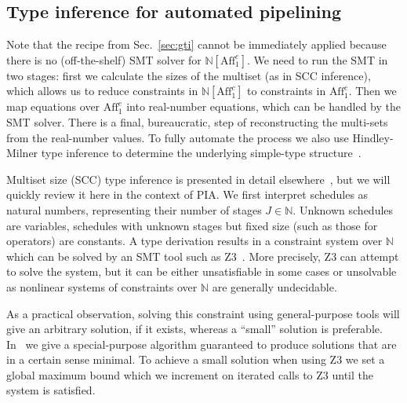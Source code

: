 \documentclass{article}
\begin{document}
\subsection{Type inference for automated pipelining}\label{sec:typin}\label{sec:pip}

Note that the recipe from Sec.~\ref{sec:gti} cannot be immediately applied because there is no (off-the-shelf) SMT solver for $\mathbb N[\text{Aff}_1^c]$. We need to run the SMT in two stages: first we calculate the sizes of the multiset (as in SCC inference), which allows us to reduce constraints in $\mathbb N[\text{Aff}_1^c]$ to constraints in $\text{Aff}_1^c$. Then we map equations over $\text{Aff}_1^c$ into real-number equations, which can be handled by the SMT solver. There is a final, bureaucratic, step of reconstructing the multi-sets from the real-number values. To fully automate the process we also use Hindley-Milner type inference to determine the underlying simple-type structure~\cite{milner1978theory}. 

Multiset size (SCC) type inference is presented in detail elsewhere~\cite{DBLP:conf/popl/GhicaS11}, but we will quickly review it here in the context of PIA. We first interpret schedules as natural numbers, representing their number of stages $J\in\mathbb N$. Unknown schedules are variables, schedules with unknown stages but fixed size (such as those for operators) are constants. A type derivation results in a constraint system over $\mathbb N$ which can be solved by an SMT tool such as Z3~\cite{Z3}. More precisely, Z3 can attempt to solve the system, but it can be either unsatisfiable in some cases or unsolvable as nonlinear systems of constraints over $\mathbb N$ are generally undecidable. 

As a practical observation, solving this constraint using general-purpose tools will give an arbitrary solution, if it exists, whereas a ``small'' solution is preferable. In~\cite{DBLP:conf/popl/GhicaS11} we give a special-purpose algorithm guaranteed to produce solutions that are in a certain sense minimal. To achieve a small solution when using Z3 we set a global maximum bound which we increment on iterated calls to Z3 until the system is satisfied. 
\end{document}
